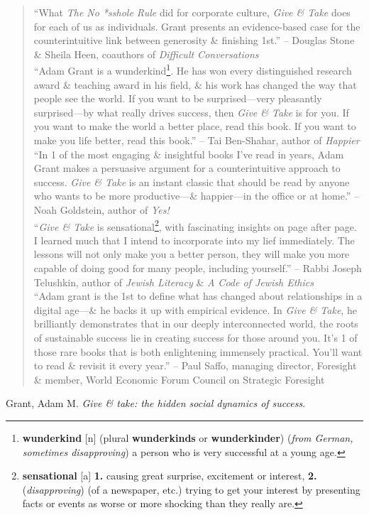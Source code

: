 \documentclass[oneside]{book}
\numberwithin{equation}{section}
\begin{document}
\begin{quotation}
	``What \textit{The No *sshole Rule} did for corporate culture, \textit{Give \& Take} does for each of us as individuals. Grant presents an evidence-based case for the counterintuitive link between generosity \& finishing 1st.'' -- Douglas Stone \& Sheila Heen, coauthors of \textit{Difficult Conversations}\\
	
	``Adam Grant is a wunderkind\footnote{\textbf{wunderkind} [n] (plural \textbf{wunderkinds} or \textbf{wunderkinder}) (\textit{from German, sometimes disapproving}) a person who is very successful at a young age.}. He has won every distinguished research award \& teaching award in his field, \& his work has changed the way that people see the world. If you want to be surprised---very pleasantly surprised---by what really drives success, then \textit{Give \& Take} is for you. If you want to make the world a better place, read this book. If you want to make you life better, read this book.'' -- Tai Ben-Shahar, author of \textit{Happier}\\
	
	``In 1 of the most engaging \& insightful books I've read in years, Adam Grant makes a persuasive argument for a counterintuitive approach to success. \textit{Give \& Take} is an instant classic that should be read by anyone who wants to be more productive---\& happier---in the office or at home.'' -- Noah Goldstein, author of \textit{Yes!}\\
	
	``\textit{Give \& Take} is sensational\footnote{\textbf{sensational} [a] \textbf{1.} causing great surprise, excitement or interest, \textbf{2.} (\textit{disapproving}) (of a newspaper, etc.) trying to get your interest by presenting facts or events as worse or more shocking than they really are.}, with fascinating insights on page after page. I learned much that I intend to incorporate into my lief immediately. The lessons will not only make you a better person, they will make you more capable of doing good for many people, including yourself.'' -- Rabbi Joseph Telushkin, author of \textit{Jewish Literacy} \& \textit{A Code of Jewish Ethics}\\
	
	``Adam grant is the 1st to define what has changed about relationships in a digital age---\& he backs it up with empirical evidence. In \textit{Give \& Take}, he brilliantly demonstrates that in our deeply interconnected world, the roots of sustainable success lie in creating success for those around you. It's 1 of those rare books that is both enlightening immensely practical. You'll want to read \& revisit it every year.'' -- Paul Saffo, managing director, Foresight \& member, World Economic Forum Council on Strategic Foresight
\end{quotation}
Grant, Adam M. \textit{Give \& take: the hidden social dynamics of success}.
\end{document}
